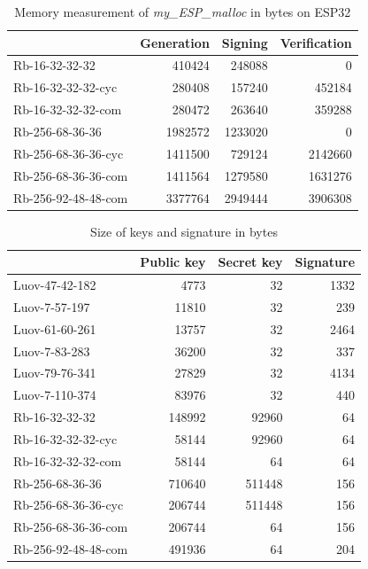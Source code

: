 \documentclass[thesis=M,english]{FITthesis}[2019/12/23]
\begin{document}
\begin{table}[]
\centering
\begin{tabular}{|l|r|r|r|}
\hline
& \multicolumn{1}{l|}{Generation} & \multicolumn{1}{l|}{Signing} & \multicolumn{1}{l|}{Verification} \\ \hline
Rb-16-32-32-32 & 410424 & 248088 & 0 \\ \hline
Rb-16-32-32-32-cyc & 280408 & 157240 & 452184 \\ \hline
Rb-16-32-32-32-com & 280472 & 263640 & 359288 \\ \hline
Rb-256-68-36-36 & 1982572 & 1233020 & 0 \\ \hline
Rb-256-68-36-36-cyc & 1411500 & 729124 & 2142660 \\ \hline
Rb-256-68-36-36-com & 1411564 & 1279580 & 1631276 \\ \hline
Rb-256-92-48-48-com & 3377764 & 2949444 & 3906308 \\ \hline
\end{tabular}
\caption{Memory measurement of \textit{my\_ESP\_malloc} in bytes on ESP32}
\end{table}

\begin{table}[]
\centering
\begin{tabular}{|l|r|r|r|}
\hline
& \multicolumn{1}{l|}{{ Public key}} & \multicolumn{1}{l|}{{ Secret key}} & \multicolumn{1}{l|}{{ Signature}} \\ \hline
Luov-47-42-182 & 4773 & 32 & 1332 \\ \hline
Luov-7-57-197 & 11810 & 32 & 239 \\ \hline
Luov-61-60-261 & 13757 & 32 & 2464 \\ \hline
Luov-7-83-283 & 36200 & 32 & 337 \\ \hline
Luov-79-76-341 & 27829 & 32 & 4134 \\ \hline
Luov-7-110-374 & 83976 & 32 & 440 \\ \hline
Rb-16-32-32-32 & 148992 & 92960 & 64 \\ \hline
Rb-16-32-32-32-cyc & 58144 & 92960 & 64 \\ \hline
Rb-16-32-32-32-com & 58144 & 64 & 64 \\ \hline
Rb-256-68-36-36 & 710640 & 511448 & 156 \\ \hline
Rb-256-68-36-36-cyc & 206744 & 511448 & 156 \\ \hline
Rb-256-68-36-36-com & 206744 & 64 & 156 \\ \hline
Rb-256-92-48-48-com & 491936 & 64 & 204 \\ \hline
\end{tabular}
\caption{Size of keys and signature in bytes}
\end{table}
\end{document}
